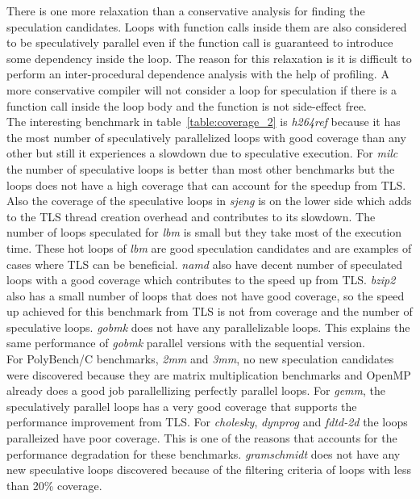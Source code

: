 \documentclass[10pt]{report}          %
\begin{document}
There is one more relaxation than a conservative analysis for finding the speculation candidates.  Loops with function calls inside them are also considered to be speculatively parallel even if the function call is guaranteed to introduce some dependency inside the loop.  The reason for this relaxation is it is difficult to perform an inter-procedural dependence analysis with the help of profiling.  A more conservative compiler will not consider a loop for speculation if there is a function call inside the loop body and the function is not side-effect free. \\

The interesting benchmark in table~\ref{table:coverage_2} is \textit{h264ref} because it has the most number of speculatively parallelized loops with good coverage than any other but still it experiences a slowdown due to speculative execution.  For \textit{milc} the number of speculative loops is better than most other benchmarks but the loops does not have a high coverage that can account for the speedup from TLS.  Also the coverage of the speculative loops in \textit{sjeng} is on the lower side which adds to the TLS thread creation overhead and contributes to its slowdown.  The number of loops speculated for \textit{lbm} is small but they take most of the execution  time.  These hot loops of \textit{lbm} are good speculation candidates and are examples of cases where TLS can be beneficial.  \textit{namd} also have decent number of speculated loops with a good coverage which contributes to the speed up from TLS.  \textit{bzip2} also has a small number of loops that does not have good coverage, so the speed up achieved for this benchmark from TLS is not from coverage and the number of speculative loops. \textit{gobmk} does not have any parallelizable loops.  This explains the same performance of \textit{gobmk} parallel versions with the sequential version. \\

For PolyBench/C benchmarks, \textit{2mm} and \textit{3mm}, no new speculation candidates were discovered because they are matrix multiplication benchmarks and OpenMP already does a good job parallellizing perfectly parallel loops. For \textit{gemm}, the speculatively parallel loops has a very good coverage that supports the performance improvement from TLS.  For \textit{cholesky}, \textit{dynprog} and \textit{fdtd-2d} the loops paralleized have poor coverage.  This is one of the reasons that accounts for the performance degradation for these benchmarks. \textit{gramschmidt} does not have any new speculative loops discovered because of the filtering criteria of loops with less than 20\% coverage.
\end{document}

